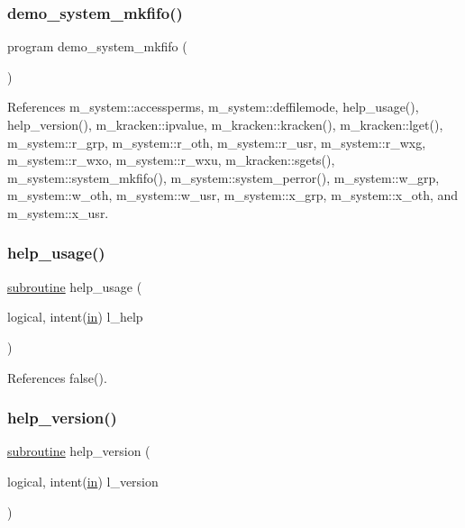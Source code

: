 \subsubsection{\texorpdfstring{demo\+\_\+system\+\_\+mkfifo()}{demo\_system\_mkfifo()}}
{\footnotesize\ttfamily program demo\+\_\+system\+\_\+mkfifo (\begin{DoxyParamCaption}{ }\end{DoxyParamCaption})}



References m\+\_\+system\+::accessperms, m\+\_\+system\+::deffilemode, help\+\_\+usage(), help\+\_\+version(), m\+\_\+kracken\+::ipvalue, m\+\_\+kracken\+::kracken(), m\+\_\+kracken\+::lget(), m\+\_\+system\+::r\+\_\+grp, m\+\_\+system\+::r\+\_\+oth, m\+\_\+system\+::r\+\_\+usr, m\+\_\+system\+::r\+\_\+wxg, m\+\_\+system\+::r\+\_\+wxo, m\+\_\+system\+::r\+\_\+wxu, m\+\_\+kracken\+::sgets(), m\+\_\+system\+::system\+\_\+mkfifo(), m\+\_\+system\+::system\+\_\+perror(), m\+\_\+system\+::w\+\_\+grp, m\+\_\+system\+::w\+\_\+oth, m\+\_\+system\+::w\+\_\+usr, m\+\_\+system\+::x\+\_\+grp, m\+\_\+system\+::x\+\_\+oth, and m\+\_\+system\+::x\+\_\+usr.

\mbox{\label{__mkfifo_8f90_a3e09a3b52ee8fb04eeb93fe5761626a8}} 
\subsubsection{\texorpdfstring{help\+\_\+usage()}{help\_usage()}}
{\footnotesize\ttfamily \hyperlink{M__stopwatch_83_8txt_acfbcff50169d691ff02d4a123ed70482}{subroutine} help\+\_\+usage (\begin{DoxyParamCaption}\item[{logical, intent(\hyperlink{M__journal_83_8txt_afce72651d1eed785a2132bee863b2f38}{in})}]{l\+\_\+help }\end{DoxyParamCaption})}



References false().

\mbox{\label{__mkfifo_8f90_a39c21619b08a3c22f19e2306efd7f766}} 
\subsubsection{\texorpdfstring{help\+\_\+version()}{help\_version()}}
{\footnotesize\ttfamily \hyperlink{M__stopwatch_83_8txt_acfbcff50169d691ff02d4a123ed70482}{subroutine} help\+\_\+version (\begin{DoxyParamCaption}\item[{logical, intent(\hyperlink{M__journal_83_8txt_afce72651d1eed785a2132bee863b2f38}{in})}]{l\+\_\+version }\end{DoxyParamCaption})}



